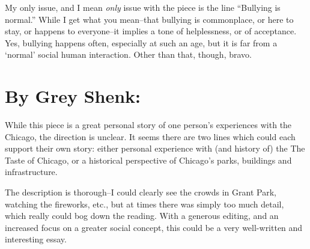 \documentclass[letterpaper]{article}
\begin{document}
    My only issue, and I mean \emph{only} issue with the piece is the line ``Bullying is normal.'' While I get what you mean--that bullying is commonplace, or here to stay, or happens to everyone--it implies a tone of helplessness, or of acceptance. Yes, bullying happens often, especially at such an age, but it is far from a `normal' social human interaction. Other than that, though, bravo.

    \section{By Grey Shenk:}
    While this piece is a great personal story of one person's experiences with the Chicago, the direction is unclear. It seems there are two lines which could each support their own story: either personal experience with (and history of) the The Taste of Chicago, or a historical perspective of Chicago's parks, buildings and infrastructure.

    The description is thorough--I could clearly see the crowds in Grant Park, watching the fireworks, etc., but at times there was simply too much detail, which really could bog down the reading. With a generous editing, and an increased focus on a greater social concept, this could be a very well-written and interesting essay. 
\end{document}
